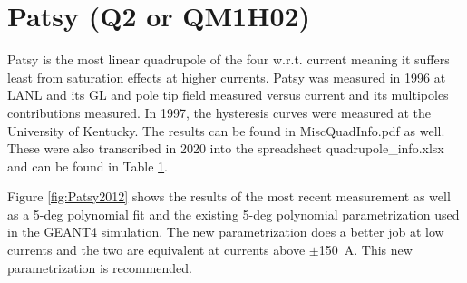 \documentclass[12pt]{article}
\begin{document}
\section{Patsy (Q2 or QM1H02)}
Patsy is the most linear quadrupole of the four w.r.t. current meaning it suffers least from saturation effects at higher currents. Patsy was measured in 1996 at LANL and its GL and pole tip field measured versus current and its multipoles contributions measured. In 1997, the hysteresis curves were measured at the University of Kentucky. The results can be found in MiscQuadInfo.pdf as well. These were also transcribed in 2020 into the spreadsheet quadrupole\_info.xlsx and can be found in Table \ref{}.


Figure \ref{fig:Patsy2012} shows the results of the most recent measurement as well as a 5-deg polynomial fit and the existing 5-deg polynomial parametrization used in the GEANT4 simulation. The new parametrization does a better job at low currents and the two are equivalent at currents above $\pm$150~A. This new parametrization is recommended.
\end{document}
